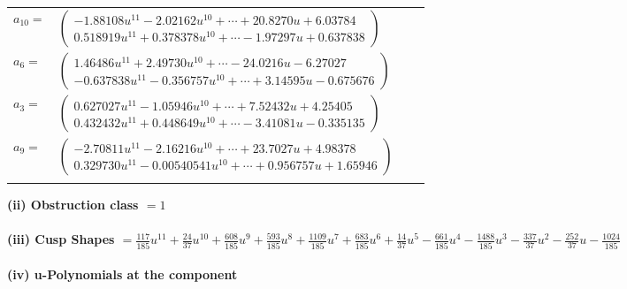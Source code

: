 \documentclass[1p]{elsarticle_modified}
\theoremstyle{definition}
\begin{document}
\begin{tabular}{m{7pt} m{180pt} m{7pt} m{180pt} }
\flushright $a_{10}=$&$\begin{pmatrix}-1.88108 u^{11}-2.02162 u^{10}+\cdots+20.8270 u+6.03784\\0.518919 u^{11}+0.378378 u^{10}+\cdots-1.97297 u+0.637838\end{pmatrix}$ \\
\flushright $a_{6}=$&$\begin{pmatrix}1.46486 u^{11}+2.49730 u^{10}+\cdots-24.0216 u-6.27027\\-0.637838 u^{11}-0.356757 u^{10}+\cdots+3.14595 u-0.675676\end{pmatrix}$ \\
\flushright $a_{3}=$&$\begin{pmatrix}0.627027 u^{11}-1.05946 u^{10}+\cdots+7.52432 u+4.25405\\0.432432 u^{11}+0.448649 u^{10}+\cdots-3.41081 u-0.335135\end{pmatrix}$ \\
\flushright $a_{9}=$&$\begin{pmatrix}-2.70811 u^{11}-2.16216 u^{10}+\cdots+23.7027 u+4.98378\\0.329730 u^{11}-0.00540541 u^{10}+\cdots+0.956757 u+1.65946\end{pmatrix}$\\&\end{tabular}
\flushleft \textbf{(ii) Obstruction class $= 1$}\\~\\
\flushleft \textbf{(iii) Cusp Shapes $= \frac{117}{185} u^{11}+\frac{24}{37} u^{10}+\frac{608}{185} u^9+\frac{593}{185} u^8+\frac{1109}{185} u^7+\frac{683}{185} u^6+\frac{14}{37} u^5-\frac{661}{185} u^4-\frac{1488}{185} u^3-\frac{337}{37} u^2-\frac{252}{37} u-\frac{1024}{185}$}\\~\\
\newpage\renewcommand{\arraystretch}{1}
\flushleft \textbf{(iv) u-Polynomials at the component}\newline \\
\end{document}

